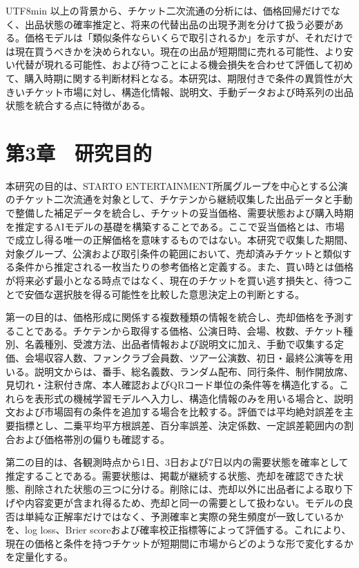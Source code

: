 \documentclass[a4paper,12pt]{report}
\begin{document}
\begin{CJK}{UTF8}{min}
以上の背景から、チケット二次流通の分析には、価格回帰だけでなく、出品状態の確率推定と、将来の代替出品の出現予測を分けて扱う必要がある。価格モデルは「類似条件ならいくらで取引されるか」を示すが、それだけでは現在買うべきかを決められない。現在の出品が短期間に売れる可能性、より安い代替が現れる可能性、および待つことによる機会損失を合わせて評価して初めて、購入時期に関する判断材料となる。本研究は、期限付きで条件の異質性が大きいチケット市場に対し、構造化情報、説明文、手動データおよび時系列の出品状態を統合する点に特徴がある。

\chapter*{第3章　研究目的}

本研究の目的は、STARTO ENTERTAINMENT所属グループを中心とする公演のチケット二次流通を対象として、チケテンから継続収集した出品データと手動で整備した補足データを統合し、チケットの妥当価格、需要状態および購入時期を推定するAIモデルの基礎を構築することである。ここで妥当価格とは、市場で成立し得る唯一の正解価格を意味するものではない。本研究で収集した期間、対象グループ、公演および取引条件の範囲において、売却済みチケットと類似する条件から推定される一枚当たりの参考価格と定義する。また、買い時とは価格が将来必ず最小となる時点ではなく、現在のチケットを買い逃す損失と、待つことで安価な選択肢を得る可能性を比較した意思決定上の判断とする。

第一の目的は、価格形成に関係する複数種類の情報を統合し、売却価格を予測することである。チケテンから取得する価格、公演日時、会場、枚数、チケット種別、名義種別、受渡方法、出品者情報および説明文に加え、手動で収集する定価、会場収容人数、ファンクラブ会員数、ツアー公演数、初日・最終公演等を用いる。説明文からは、番手、総名義数、ランダム配布、同行条件、制作開放席、見切れ・注釈付き席、本人確認およびQRコード単位の条件等を構造化する。これらを表形式の機械学習モデルへ入力し、構造化情報のみを用いる場合と、説明文および市場固有の条件を追加する場合を比較する。評価では平均絶対誤差を主要指標とし、二乗平均平方根誤差、百分率誤差、決定係数、一定誤差範囲内の割合および価格帯別の偏りも確認する。

第二の目的は、各観測時点から1日、3日および7日以内の需要状態を確率として推定することである。需要状態は、掲載が継続する状態、売却を確認できた状態、削除された状態の三つに分ける。削除には、売却以外に出品者による取り下げや内容変更が含まれ得るため、売却と同一の需要として扱わない。モデルの良否は単純な正解率だけではなく、予測確率と実際の発生頻度が一致しているかを、log loss、Brier scoreおよび確率校正指標等によって評価する。これにより、現在の価格と条件を持つチケットが短期間に市場からどのような形で変化するかを定量化する。


\end{CJK}
\end{document}
